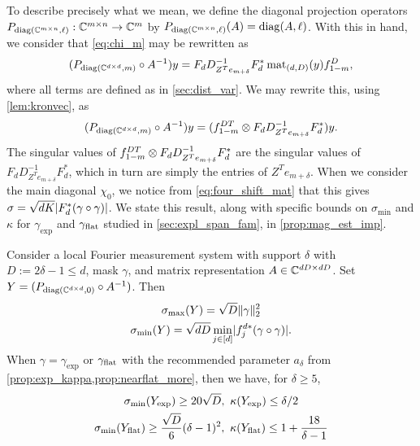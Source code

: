 To describe precisely what we mean, we define the diagonal projection operators $P_{\operatorname{diag}(\mathbb{C}^{m \times n}, \ell)} : \mathbb{C}^{m \times n} \to \mathbb{C}^m$ by $P_{\operatorname{diag}(\mathbb{C}^{m \times n}, \ell)}(A) = \operatorname{diag}(A, \ell)$.  With this in hand, we consider that \eqref{eq:chi_m} may be rewritten as \begin{equation} (P_{\operatorname{diag}(\mathbb{C}^{d \times d}, m)} \circ A^{-1}) y = F_d D^{-1}_{Z^T e_{m + \delta}} F_d^* \operatorname{mat}_{(d, D)}(y) f_{1 - m}^D, \label{eq:chi_mop} \end{equation} where all terms are defined as in \cref{sec:dist_var}.  We may rewrite this, using \cref{lem:kronvec}, as \[(P_{\operatorname{diag}(\mathbb{C}^{d \times d}, m)} \circ A^{-1}) y = (f_{1 - m}^{D T} \otimes F_d D^{-1}_{Z^T e_{m + \delta}} F_d^*) y.\]  The singular values of $f_{1 - m}^{D T} \otimes F_d D^{-1}_{Z^T e_{m + \delta}} F_d^*$ are the singular values of $F_d D^{-1}_{Z^T e_{m + \delta}} F_d^*$, which in turn are simply the entries of $Z^T e_{m + \delta}$.  When we consider the main diagonal $\chi_0$, we notice from \eqref{eq:four_shift_mat} that this gives $\sigma = \sqrt{d K} \lvert F_d^* (\gamma \circ \gamma)\rvert$.  We state this result, along with specific bounds on $\sigma_{\min}$ and $\kappa$ for $\gamma_{\exp}$ and $\gamma_{\rm flat}$ studied in \cref{sec:expl_span_fam}, in \cref{prop:mag_est_imp}.

\begin{proposition} \label{prop:mag_est_imp}
  Consider a local Fourier measurement system with support $\delta$ with $D := 2 \delta - 1 \le d$, mask $\gamma$, and matrix representation $A \in \mathbb{C}^{d D \times d D}$.  Set $Y = (P_{\operatorname{diag}(\mathbb{C}^{d \times d}, 0)} \circ A^{-1})$.  Then 
  \begin{equation}
    \begin{gathered}
      \sigma_{\max}(Y) = \sqrt{D} \lVert\gamma\rVert_2^2 \\
      \sigma_{\min}(Y) = \sqrt{d D} \min_{j \in [d]} \lvert f_j^{d*} (\gamma \circ \gamma)\rvert.
    \end{gathered}
    \label{eq:magimp}
  \end{equation}
  When $\gamma = \gamma_{\exp}$ or $\gamma_{\rm flat}$ with the recommended parameter $a_\delta$ from \cref{prop:exp_kappa,prop:nearflat_more}, then we have, for $\delta \ge 5$,
  \begin{equation}
    \begin{gathered}
      \sigma_{\min}(Y_{\exp}) \ge 20 \sqrt{D}, \ \kappa(Y_{\exp}) \le \delta / 2 \\
      \sigma_{\min}(Y_{\rm flat})  \ge \frac{\sqrt{D}}{6} (\delta - 1)^2, \ \kappa(Y_{\rm flat})  \le 1 + \frac{18}{\delta - 1}
    \end{gathered}
    \label{eq:mask_magimp}
  \end{equation}
\end{proposition}


